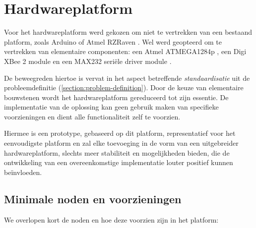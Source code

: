 
\chapter{Hardwareplatform}
\label{hardware-platform}

Voor het hardwareplatform werd gekozen om niet te vertrekken van een bestaand
platform, zoals Arduino \citep{url:arduino} of Atmel RZRaven
\citep{manual:rzraven}. Wel werd geopteerd om te vertrekken van elementaire
componenten: een Atmel ATMEGA1284p \mcu \citep{datasheet:atmega1284p}, een Digi
XBee 2 module \citep{manual:xbee} en een MAX232 seri\"ele driver module
\citep{datasheet:max232}.

De beweegreden hiertoe is vervat in het aspect betreffende
\emph{standaardisatie} uit de probleemdefinitie
(\ref{section:problem-definition}). Door de keuze van elementaire bouwstenen
wordt het hardwareplatform gereduceerd tot zijn essentie. De implementatie van
de oplossing kan geen gebruik maken van specifieke voorzieningen en dient alle
functionaliteit zelf te voorzien.

Hiermee is een prototype, gebaseerd op dit platform, representatief voor het
eenvoudigste platform en zal elke toevoeging in de vorm van een uitgebreider
hardwareplatform, slechts meer stabiliteit en mogelijkheden bieden, die de
ontwikkeling van een overeenkomstige implementatie louter positief kunnen
be\"invloeden.

\section{Minimale noden en voorzieningen}

We overlopen kort de noden en hoe deze voorzien zijn in het platform:

